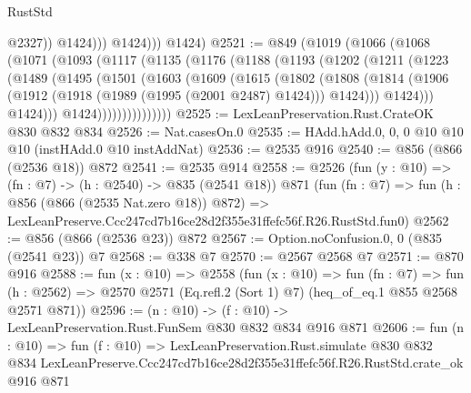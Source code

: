 \begin{lexlean}{RustStd}
\begin{coremodule}
                      @2327))
                  @1424)))
            @1424)))
      @1424)
@2521 := @849
    (@1019
      (@1066
        (@1068
          (@1071
            (@1093
              (@1117
                (@1135
                  (@1176
                    (@1188
                      (@1193
                        (@1202
                          (@1211
                            (@1223
                              (@1489
                                (@1495
                                  (@1501
                                    (@1603
                                      (@1609
                                        (@1615
                                          (@1802
                                            (@1808
                                              (@1814
                                                (@1906
                                                  (@1912
                                                    (@1918 (@1989 (@1995 (@2001 @2487) @1424)))
                                                    @1424)))
                                              @1424)))
                                        @1424)))
                                  @1424)))))))))))))))
@2525 := LexLeanPreservation.Rust.CrateOK @830 @832 @834
@2526 := Nat.casesOn.{0}
@2535 := HAdd.hAdd.{0, 0, 0} @10 @10 @10 (instHAdd.{0} @10 instAddNat)
@2536 := @2535 @916
@2540 := @856 (@866 (@2536 @18)) @872
@2541 := @2535 @914
@2558 := @2526
    (fun (y : @10) => (fn : @7) -> (h : @2540) -> @835 (@2541 @18))
    @871
    (fun (fn : @7) =>
    fun (h : @856 (@866 (@2535 Nat.zero @18)) @872) =>
    LexLeanPreserve.Ccc247cd7b16ce28d2f355e31ffefc56f.R26.RustStd.fun0)
@2562 := @856 (@866 (@2536 @23)) @872
@2567 := Option.noConfusion.{0, 0} (@835 (@2541 @23)) @7
@2568 := @338 @7
@2570 := @2567 @2568 @7
@2571 := @870 @916
@2588 := fun (x : @10) =>
  @2558
    (fun (x : @10) =>
    fun (fn : @7) =>
    fun (h : @2562) => @2570 @2571 (Eq.refl.{2} (Sort 1) @7) (heq_of_eq.{1} @855 @2568 @2571 @871))
@2596 := (n : @10) -> (f : @10) -> LexLeanPreservation.Rust.FunSem @830 @832 @834 @916 @871
@2606 := fun (n : @10) =>
  fun (f : @10) =>
  LexLeanPreservation.Rust.simulate
    @830
    @832
    @834
    LexLeanPreserve.Ccc247cd7b16ce28d2f355e31ffefc56f.R26.RustStd.crate_ok
    @916
    @871
\end{coremodule}
\end{lexlean}
